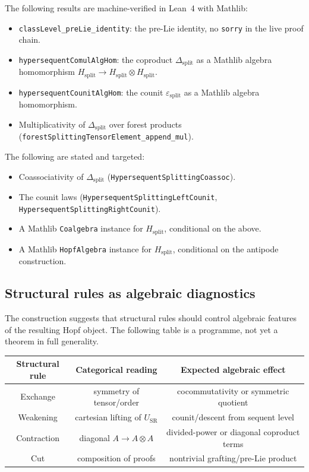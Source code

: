 \documentclass[11pt]{article}
\begin{document}
The following results are machine-verified in Lean~4 with Mathlib:
\begin{itemize}
\item \texttt{classLevel\_preLie\_identity}: the pre-Lie identity, no \texttt{sorry} in the live proof chain.
\item \texttt{hypersequentComulAlgHom}: the coproduct $\Delta_{\mathrm{split}}$ as a Mathlib algebra homomorphism $H_{\mathrm{split}}\to H_{\mathrm{split}}\otimes H_{\mathrm{split}}$.
\item \texttt{hypersequentCounitAlgHom}: the counit $\varepsilon_{\mathrm{split}}$ as a Mathlib algebra homomorphism.
\item Multiplicativity of $\Delta_{\mathrm{split}}$ over forest products (\texttt{forestSplittingTensorElement\_append\_mul}).
\end{itemize}
The following are stated and targeted:
\begin{itemize}
\item Coassociativity of $\Delta_{\mathrm{split}}$ (\texttt{HypersequentSplittingCoassoc}).
\item The counit laws (\texttt{HypersequentSplittingLeftCounit}, \texttt{HypersequentSplittingRightCounit}).
\item A Mathlib \texttt{Coalgebra} instance for $H_{\mathrm{split}}$, conditional on the above.
\item A Mathlib \texttt{HopfAlgebra} instance for $H_{\mathrm{split}}$, conditional on the antipode construction.
\end{itemize}

\subsection{Structural rules as algebraic diagnostics}

The construction suggests that structural rules should control algebraic
features of the resulting Hopf object.  The following table is a programme,
not yet a theorem in full generality.

\begin{center}
\begin{tabular}{c|c|c}
Structural rule & Categorical reading & Expected algebraic effect\\
\hline
Exchange & symmetry of tensor/order & cocommutativity or symmetric quotient\\
Weakening & cartesian lifting of \(U_{\mathrm{SR}}\) & counit/descent from sequent level\\
Contraction & diagonal \(A\to A\otimes A\) & divided-power or diagonal coproduct terms\\
Cut & composition of proofs & nontrivial grafting/pre-Lie product
\end{tabular}
\end{center}
\end{document}
